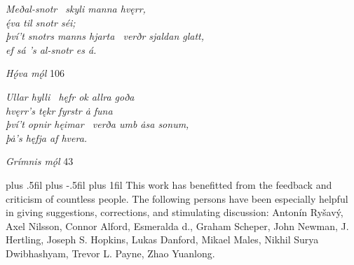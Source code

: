 \vspace{5mm}

\begin{center}{\Large \emph{Meðal-snotr \hld\ skyli manna hvęrr, \\
ę́va til snotr séi; \\
því’t snotrs manns hjarta \hld\ verðr sjaldan glatt, \\
ef sá ’s al-snotr es á.}}\end{center}

\begin{flushright}%
\emph{Hǫ́va mǫ́l} 106%
\end{flushright}

\vspace{5mm}

\begin{center}{\Large \emph{Ullar hylli \hld\ hęfr ok allra goða \\
hvęrr’s tękr fyrstr ȧ funa \\
því’t opnir hęimar \hld\ verða umb ȧsa sonum, \\
þȧ’s hęfja af hvera.}}\end{center}

\begin{flushright}%
\emph{Grímnis mǫ́l} 43%
\end{flushright}

\vfill

\newpage\thispagestyle{empty}


{\leftskip=0pt plus .5fil \rightskip=0pt plus -.5fil \parfillskip=0pt plus 1fil
\noindent This work has benefitted from the feedback and criticism of countless people.  The following persons have been especially helpful in giving suggestions, corrections, and stimulating discussion: Antonín Ryšavý, Axel Nilsson, Connor Alford, Esmeralda d., Graham Scheper, John Newman, J. Hertling, Joseph S. Hopkins, Lukas Danford, Mikael Males, Nikhil Surya Dwibhashyam, Trevor L. Payne, Zhao Yuanlong.\par}

\newpage\thispagestyle{empty}

\def\booktitle{Contents}%
\tableofcontents

\newpage\thispagestyle{empty}

\newpage



\def\booktitle{Bibliography}%

